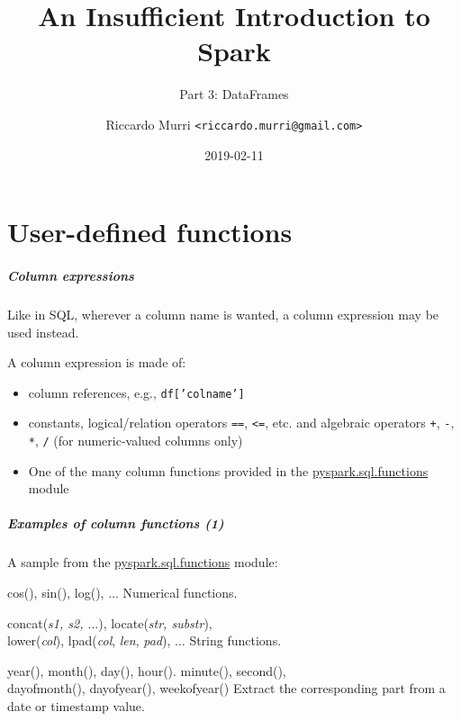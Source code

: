 \documentclass[english,serif,mathserif]{beamer}
\begin{document}
\title[Spark]{An Insufficient Introduction to Spark}
\subtitle{Part 3: DataFrames}
\author{Riccardo Murri \texttt{<riccardo.murri@gmail.com>}}
\date{2019-02-11}

\maketitle

\part{User-defined functions}

\begin{frame}[fragile]
  \frametitle{Column expressions}

  Like in SQL, wherever a column name is wanted, a column expression may be used
  instead.

  \+
  A column expression is made of:
  \begin{itemize}
  \item column references, e.g., \texttt{df['colname']}
  \item constants, logical/relation operators \texttt{==}, \texttt{<=}, etc. and
    algebraic operators \texttt{+}, \texttt{-}, \texttt{*}, \texttt{/} (for
    numeric-valued columns only)
  \item One of the many column functions provided in the
    \href{http://spark.apache.org/docs/1.5.1/api/python/pyspark.sql.html#module-pyspark.sql.functions}{pyspark.sql.functions}
    module
  \end{itemize}
\end{frame}


\begin{frame}[fragile]
  \frametitle{Examples of column functions (1)}

  A sample from the
  \href{http://spark.apache.org/docs/1.5.1/api/python/pyspark.sql.html#module-pyspark.sql.functions}{pyspark.sql.functions}
  module:

  \+
  \begin{describe}{cos(), sin(), log(), $\ldots$}
    Numerical functions.
  \end{describe}

  \+
  \begin{describe}{concat(\emph{s1, s2, $\ldots$}), locate(\emph{str, substr}), \\
      lower(\emph{col}), lpad(\emph{col}, \emph{len}, \emph{pad}), $\ldots$}
    String functions.
  \end{describe}

  \+
  \begin{describe}{year(), month(), day(), hour(). minute(), second(), \\
      dayofmonth(), dayofyear(), weekofyear()}
    Extract the corresponding part from a date or timestamp value.
  \end{describe}

\end{frame}
\end{document}
